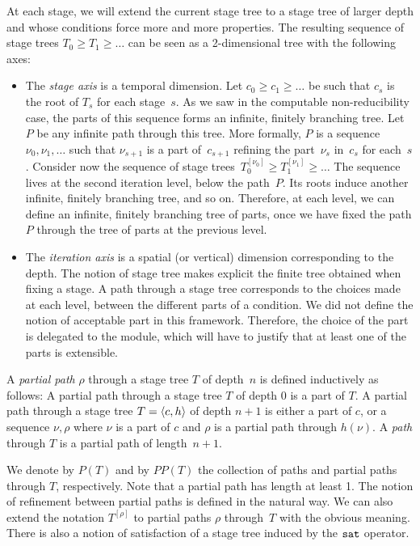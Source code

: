 At each stage, we will extend the current stage tree to a stage tree of larger depth
and whose conditions force more and more properties. The resulting
sequence of stage trees $T_0 \geq T_1 \geq \dots$ can be seen as a 2-dimensional tree
with the following axes:

\begin{itemize}
	\item The \emph{stage axis} is a temporal dimension.
	Let $c_0 \geq c_1 \geq \dots$ be such that $c_s$ is the root of $T_s$ for each stage~$s$.
	As we saw in the computable non-reducibility case, the parts of this sequence forms
	an infinite, finitely branching tree. Let $P$ be any infinite path through this tree.
	More formally, $P$ is a sequence $\nu_0, \nu_1, \dots$ such that $\nu_{s+1}$ is a part of~$c_{s+1}$
	refining the part~$\nu_s$ in~$c_s$ for each~$s$. Consider now the sequence
	of stage trees~$T_0^{[\nu_0]} \geq T_1^{[\nu_1]} \geq \dots$ The sequence lives at the second iteration level,
	below the path~$P$. Its roots induce another infinite, finitely branching tree, and so on.
	Therefore, at each level, we can define an infinite, finitely branching tree of parts,
	once we have fixed the path $P$ through the tree of parts at the previous level.

	\item The \emph{iteration axis} is a spatial (or vertical) dimension corresponding to the depth.
	The notion of stage tree makes explicit the finite tree obtained when fixing a stage.
	A path through a stage tree corresponds to the choices made at each level, between the different
	parts of a condition. We did not define the notion of acceptable part in this framework.
	Therefore, the choice of the part is delegated to the module, which will have to justify that
	at least one of the parts is extensible.
\end{itemize}

\begin{definition}
A \emph{partial path} $\rho$ through a stage tree $T$ of depth~$n$ is defined inductively as follows:
A partial path through a stage tree $T$ of depth 0 is a part of $T$.
A partial path through a stage tree $T = \left\langle c, h \right\rangle$ of depth $n+1$ is either a part of $c$,
or a sequence $\nu, \rho$ where $\nu$ is a part of $c$ 
and $\rho$ is a partial path through $h(\nu)$.
A \emph{path} through $T$ is a partial path of length~$n+1$.
\end{definition}

We denote by $P(T)$ and by $PP(T)$ the collection of paths and partial paths through $T$, respectively.
Note that a partial path has length at least 1. The notion of refinement between
partial paths is defined in the natural way. We can also extend the notation
$T^{[\rho]}$ to partial paths $\rho$ through~$T$ with the obvious meaning.
There is also a notion of satisfaction of a stage tree induced by the $\mathtt{sat}$ operator.

